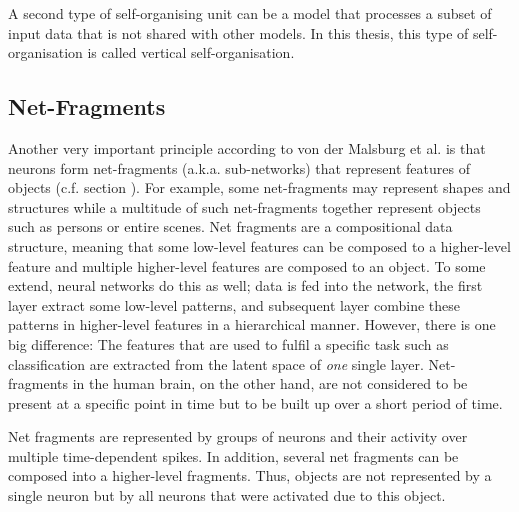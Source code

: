 \begin{implementation}
	A second type of self-organising unit can be a model that processes a subset of input data that is not shared with other models. In this thesis, this type of self-organisation is called vertical self-organisation.
\end{implementation}


\subsection{Net-Fragments}
Another very important principle according to von der Malsburg et al. \cite{von_der_Malsburg_Stadelmann_Grewe_2022} is that neurons form net-fragments (a.k.a. sub-networks) that represent features of objects (c.f. section ).
For example, some net-fragments may represent shapes and structures while a multitude of such net-fragments together represent objects such as persons or entire scenes.
Net fragments are a compositional data structure, meaning that some low-level features can be composed to a higher-level feature and multiple higher-level features are composed to an object.
To some extend, neural networks do this as well; data is fed into the network, the first layer extract some low-level patterns, and subsequent layer combine these patterns in higher-level features in a hierarchical manner.
However, there is one big difference: The features that are used to fulfil a specific task such as classification are extracted from the latent space of \emph{one} single layer.
Net-fragments in the human brain, on the other hand, are not considered to be present at a specific point in time but to be built up over a short period of time.

\begin{claim}
	Net fragments are represented by groups of neurons and their activity over multiple time-dependent spikes. In addition, several net fragments can be composed into a higher-level fragments. Thus, objects are not represented by a single neuron but by all neurons that were activated due to this object.
\end{claim}

